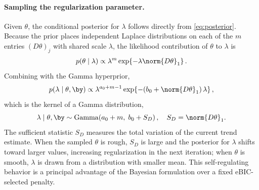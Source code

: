 \paragraph{Sampling the regularization parameter.}
Given $\theta$, the conditional posterior for $\lambda$ follows directly from \eqref{eq:posterior}. Because the prior places independent Laplace distributions on each of the $m$ entries $(D\theta)_j$ with shared scale $\lambda$, the likelihood contribution of $\theta$ to $\lambda$ is
\begin{align*}
    p(\theta \mid \lambda) \propto \lambda^{m}
    \exp\!\left\{-\lambda \norm{D\theta}_1\right\}.
\end{align*}
Combining with the Gamma hyperprior,
\begin{align*}
    p(\lambda \mid \theta, \by) \propto
    \lambda^{a_0 + m - 1}
    \exp\!\left\{-(b_0 + \norm{D\theta}_1)\,\lambda\right\},
\end{align*}
which is the kernel of a Gamma distribution,
\begin{equation}
    \lambda \mid \theta, \by \sim
    \mathrm{Gamma}\!\left(a_0 + m,\; b_0 + S_D\right),
    \quad S_D = \norm{D\theta}_1.
    \label{eq:lambdaupdate}
\end{equation}
The sufficient statistic $S_D$ measures the total variation of the current trend estimate. When the sampled $\theta$ is rough, $S_D$ is large and the posterior for $\lambda$ shifts toward larger values, increasing regularization in the next iteration; when $\theta$ is smooth, $\lambda$ is drawn from a distribution with smaller mean. This self-regulating behavior is a principal advantage of the Bayesian formulation over a fixed eBIC-selected penalty.

